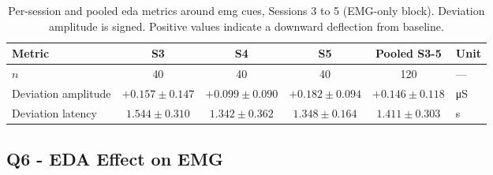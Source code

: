 \begin{table}[!htbp]
  \centering
  \caption{Per-session and pooled \gls{eda} metrics around \gls{emg} cues, Sessions 3 to 5 (EMG-only block). Deviation amplitude is signed. Positive values indicate a downward deflection from baseline.}
  \label{tab:q5b-metrics}
  \begin{tabular}{l c c c c l}
    \toprule
    \textbf{Metric} & \textbf{S3} & \textbf{S4} & \textbf{S5} & \textbf{Pooled S3-5} & \textbf{Unit} \\
    \midrule
    $n$                  & \num{40} & \num{40} & \num{40} & \num{120} & --- \\
    Deviation amplitude  & $+\num{0.157} \pm \num{0.147}$ & $+\num{0.099} \pm \num{0.090}$ & $+\num{0.182} \pm \num{0.094}$ & $+\num{0.146} \pm \num{0.118}$ & \si{\micro\siemens} \\
    Deviation latency    & $\num{1.544} \pm \num{0.310}$  & $\num{1.342} \pm \num{0.362}$  & $\num{1.348} \pm \num{0.164}$  & $\num{1.411} \pm \num{0.303}$  & \si{\second} \\
    \bottomrule
\end{tabular}
\end{table}
%
%

\FloatBarrier


\subsection{Q6 - EDA Effect on EMG}
\label{sec:results-q6}

